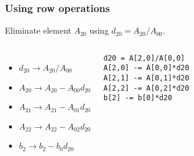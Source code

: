 \begin{frame}[fragile]
  \frametitle{Using row operations}
  Eliminate element $A_{20}$ using $d_{20}=A_{20}/A_{00}$.
  \vfill
  \vfill\pause
  \begin{columns}
  \begin{itemize}
    \item $d_{20}\rightarrow A_{20}/A_{00}$
    \item $A_{20}\rightarrow A_{20}-A_{00}d_{20}$
    \item $A_{21}\rightarrow A_{21}-A_{01}d_{20}$
    \item $A_{22}\rightarrow A_{22}-A_{02}d_{20}$
    \item $b_2   \rightarrow b_2   -b_0   d_{20}$
  \end{itemize}
  \begin{lstlisting}
d20 = A[2,0]/A[0,0]
A[2,0] -= A[0,0]*d20
A[2,1] -= A[0,1]*d20
A[2,2] -= A[0,2]*d20
b[2] -= b[0]*d20
  \end{lstlisting}
  \end{columns}
\end{frame}

